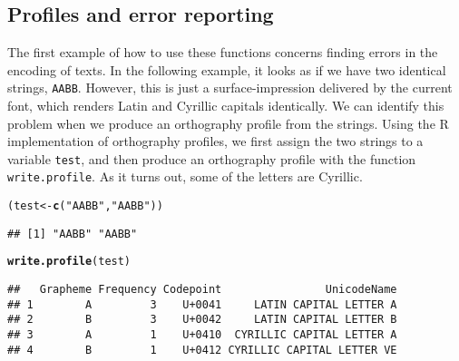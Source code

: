 \documentclass[output=book,nonflat,modfonts,
citecolor=brown,
		]{langsci/langscibook}\usepackage[]{graphicx}\usepackage[]{color}
\makeatletter
\newcommand{\hlstr}[1]{\textcolor[rgb]{0.192,0.494,0.8}{#1}}%
\newcommand{\hlstd}[1]{\textcolor[rgb]{0.345,0.345,0.345}{#1}}%
\newcommand{\hlkwb}[1]{\textcolor[rgb]{0.69,0.353,0.396}{#1}}%
\newcommand{\hlkwd}[1]{\textcolor[rgb]{0.737,0.353,0.396}{\textbf{#1}}}%
\newenvironment{kframe}{%
 \def\at@end@of@kframe{}%
 \ifinner\ifhmode%
  \def\at@end@of@kframe{\end{minipage}}%
  \begin{minipage}{\columnwidth}%
 \fi\fi%
 \def\FrameCommand##1{\hskip\@totalleftmargin \hskip-\fboxsep
 \colorbox{shadecolor}{##1}\hskip-\fboxsep
     \hskip-\linewidth \hskip-\@totalleftmargin \hskip\columnwidth}%
 \MakeFramed {\advance\hsize-\width
   \@totalleftmargin\z@ \linewidth\hsize
   \@setminipage}}%
 {\par\unskip\endMakeFramed%
 \at@end@of@kframe}
\newenvironment{knitrout}{}{} %
\makeatother
\begin{document}






\subsection*{Profiles and error reporting}
\label{error-reporting}

The first example of how to use these functions concerns finding errors in the
encoding of texts. In the following example, it looks as if we have two
identical strings, \texttt{AABB}. However, this is just a surface-impression
delivered by the current font, which renders Latin and Cyrillic capitals
identically. We can identify this problem when we produce an orthography profile
from the strings. Using the R implementation of orthography profiles, we
first assign the two strings to a variable \texttt{test}, and then produce an
orthography profile with the function \texttt{write.profile}. As it turns out,
some of the letters are Cyrillic.

\begin{knitrout}\footnotesize
{}\color{fgcolor}\begin{kframe}
\begin{alltt}
\hlstd{(test} \hlkwb{<-} \hlkwd{c}\hlstd{(}\hlstr{"AABB"}\hlstd{,} \hlstr{"AАBВ"}\hlstd{))}
\end{alltt}
\begin{verbatim}
## [1] "AABB" "AАBВ"
\end{verbatim}
\begin{alltt}
\hlkwd{write.profile}\hlstd{(test)}
\end{alltt}
\begin{verbatim}
##   Grapheme Frequency Codepoint                UnicodeName
## 1        A         3    U+0041     LATIN CAPITAL LETTER A
## 2        B         3    U+0042     LATIN CAPITAL LETTER B
## 3        А         1    U+0410  CYRILLIC CAPITAL LETTER A
## 4        В         1    U+0412 CYRILLIC CAPITAL LETTER VE
\end{verbatim}
\end{kframe}
\end{knitrout}
\end{document}
